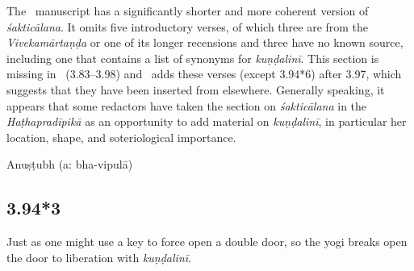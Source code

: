 \begin{ekdosis}
\begin{testimonia}[hp03_094_2]

\end{testimonia}

\begin{philcomm}[hp03_094_2]
The \alphaThree\ manuscript has a significantly shorter and more coherent version of \emph{śakticālana}. It omits five introductory verses, of which three are from the \emph{Vivekamārtaṇḍa} or one of its longer recensions and three have no known source, including one that contains a list of synonyms for \emph{kuṇḍalinī}. This section is missing in \alphaOne\ (3.83–3.98) and \alphaTwo\ adds these verses (except 3.94*6) after 3.97, which suggests that they have been inserted from elsewhere. Generally speaking, it appears that some redactors have taken the section on \emph{śakticālana} in the \emph{Haṭhapradīpikā} as an opportunity to add material on \emph{kuṇḍalinī}, in particular her location, shape, and soteriological importance. 

\end{philcomm}

\begin{metre}[hp03_094_2]
Anuṣṭubh (a: bha-vipulā)
\end{metre}

\subsection*{3.94*3}
\begin{translation}[hp03_094_3]
Just as one might use a key to force open a double door, so the yogi breaks open the door to liberation with \emph{kuṇḍalinī}.
\end{translation}


\end{ekdosis}

